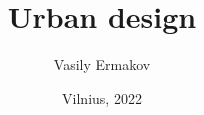 \documentclass{beamer}
\begin{document}
    \title{Urban design}
    \author{Vasily Ermakov}
    \date{Vilnius, 2022}
    \frame{\titlepage}
\end{document}
